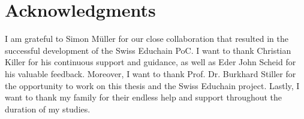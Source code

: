 \chapter*{Acknowledgments}

I am grateful to Simon M{\"u}ller for our close collaboration that resulted in the successful development of the Swiss Educhain PoC. I want to thank Christian Killer for his continuous support and guidance, as well as Eder John Scheid for his valuable feedback. Moreover, I want to thank Prof. Dr. Burkhard Stiller for the opportunity to work on this thesis and the Swiss Educhain project. Lastly, I want to thank my family for their endless help and support throughout the duration of my studies.